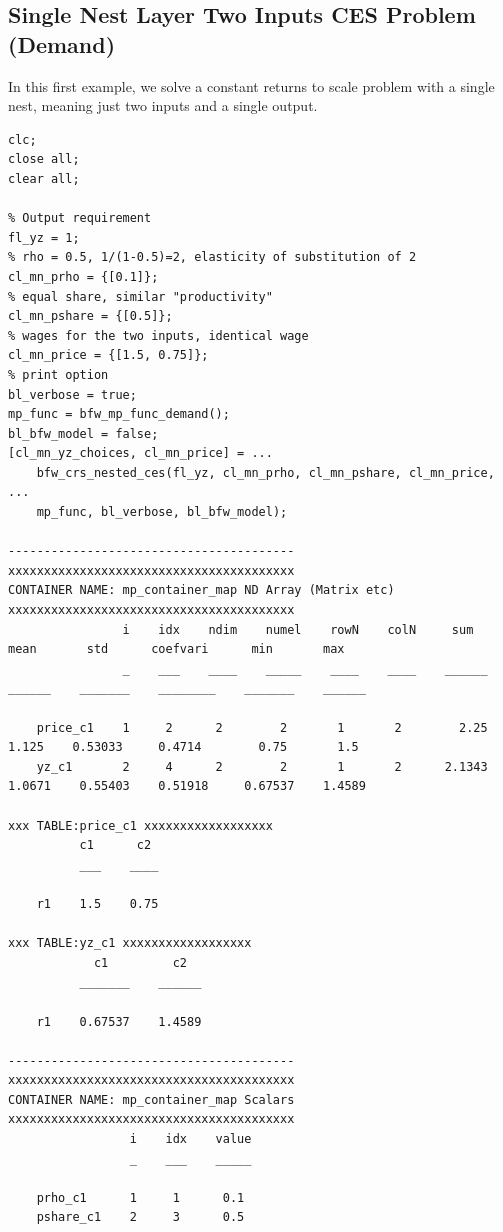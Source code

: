 \documentclass[
]{book}
\begin{document}
\hypertarget{single-nest-layer-two-inputs-ces-problem-demand}{%
\subsection{Single Nest Layer Two Inputs CES Problem (Demand)}\label{single-nest-layer-two-inputs-ces-problem-demand}}

In this first example, we solve a constant returns to scale problem with
a single nest, meaning just two inputs and a single output.

\begin{verbatim}
clc;
close all;
clear all;

% Output requirement
fl_yz = 1;
% rho = 0.5, 1/(1-0.5)=2, elasticity of substitution of 2
cl_mn_prho = {[0.1]};
% equal share, similar "productivity"
cl_mn_pshare = {[0.5]};
% wages for the two inputs, identical wage
cl_mn_price = {[1.5, 0.75]};
% print option
bl_verbose = true;
mp_func = bfw_mp_func_demand();
bl_bfw_model = false;
[cl_mn_yz_choices, cl_mn_price] = ...
    bfw_crs_nested_ces(fl_yz, cl_mn_prho, cl_mn_pshare, cl_mn_price, ...
    mp_func, bl_verbose, bl_bfw_model);

----------------------------------------
xxxxxxxxxxxxxxxxxxxxxxxxxxxxxxxxxxxxxxxx
CONTAINER NAME: mp_container_map ND Array (Matrix etc)
xxxxxxxxxxxxxxxxxxxxxxxxxxxxxxxxxxxxxxxx
                i    idx    ndim    numel    rowN    colN     sum       mean       std      coefvari      min       max  
                _    ___    ____    _____    ____    ____    ______    ______    _______    ________    _______    ______

    price_c1    1     2      2        2       1       2        2.25     1.125    0.53033     0.4714        0.75       1.5
    yz_c1       2     4      2        2       1       2      2.1343    1.0671    0.55403    0.51918     0.67537    1.4589

xxx TABLE:price_c1 xxxxxxxxxxxxxxxxxx
          c1      c2 
          ___    ____

    r1    1.5    0.75

xxx TABLE:yz_c1 xxxxxxxxxxxxxxxxxx
            c1         c2  
          _______    ______

    r1    0.67537    1.4589

----------------------------------------
xxxxxxxxxxxxxxxxxxxxxxxxxxxxxxxxxxxxxxxx
CONTAINER NAME: mp_container_map Scalars
xxxxxxxxxxxxxxxxxxxxxxxxxxxxxxxxxxxxxxxx
                 i    idx    value
                 _    ___    _____

    prho_c1      1     1      0.1 
    pshare_c1    2     3      0.5 
\end{verbatim}
\end{document}
